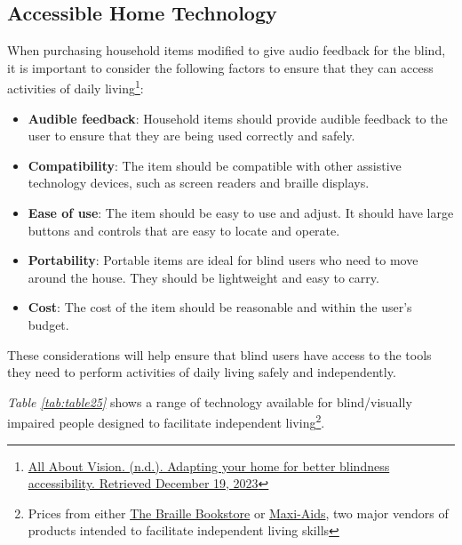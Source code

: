 \hypertarget{ind-living-tools}{}\subsection{Accessible Home Technology}\label{ind-living-tools}
When purchasing household items modified to give audio feedback for the blind, it is important to consider the following factors to ensure that they can access activities of daily living\footnote{\raggedright \href{http://www.allaboutvision.com/resources/adapting-the-home-better-blindness-accessibility/}{All About Vision. (n.d.). Adapting your home for better blindness accessibility. Retrieved December 19, 2023}}:
\begin{itemize}[leftmargin=*]
 \item \textbf{Audible feedback}: Household items should provide audible feedback to the user to ensure that they are being used correctly and safely.
 \item \textbf{Compatibility}: The item should be compatible with other assistive technology devices, such as screen readers and braille displays.
 \item \textbf{Ease of use}: The item should be easy to use and adjust. It should have large buttons and controls that are easy to locate and operate.
 \item \textbf{Portability}: Portable items are ideal for blind users who need to move around the house. They should be lightweight and easy to carry.
 \item \textbf{Cost}: The cost of the item should be reasonable and within the user’s budget.
\end{itemize}
These considerations will help ensure that blind users have access to the tools they need to perform activities of daily living safely and independently.

\textit{Table \ref{tab:table25}} shows a range of technology available for blind/visually impaired people designed to facilitate independent living\footnote{\raggedright Prices from either \href{http://www.braillebookstore.com/}{The Braille Bookstore} or \href{http://www.maxiaids.com/}{Maxi-Aids}, two major vendors of products intended to facilitate independent living skills}.

\pagebreak 
 

